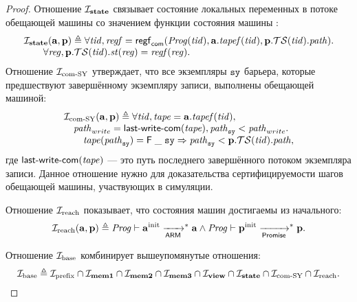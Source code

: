 \begin{proof}
Отношение $\mathcal{I}_{\rm \bf state}$ связывает состояние локальных переменных в потоке обещающей
машины со значением функции состояния машины \ARMt:
\[\begin{array}{l}
\mathcal{I}_{\rm \bf state}(\mathbf{a}, \mathbf{p}) \triangleq
  \forall \mathit{tid}, \mathit{regf} = \mathsf{regf}_\mathsf{com}(\mathit{Prog}(\mathit{tid}), \mathbf{a}.\mathit{tapef}(\mathit{tid}), \mathbf{p}.\mathcal{TS}(\mathit{tid}).\mathit{path}). \\
  \quad \quad \forall \mathit{reg}, \mathbf{p}.\mathcal{TS}(\mathit{tid}).\mathit{st}(\mathit{reg}) = \mathit{regf}(\mathit{reg}).\\
\end{array}\]
Отношение $\mathcal{I}_{\textup{\rm com-SY}}$ утверждает, что все экземпляры $\mathtt{sy}$ барьера, которые
предшествуют завершённому экземпляру записи, выполнены обещающей машиной:
\[\begin{array}{l}
\invComWrite(\aT, \p) \triangleq
  \forall \tId, \tape = \aT.\tapef(\tId), \\
  \quad \cpath_{write} = \lastCommittedWrite(\tape), \cpath_{\SY} < \cpath_{write}. \\
  \qquad  \tape(\cpath_{\SY}) = \tapeFence{\_}{\SY} \Rightarrow \cpath_{\SY} < \p.\TSfprom(\tId).\cpath,
\end{array}\]
где $\textup{\sf last-write-com}(\mathit{tape})$ --- это путь последнего завершённого потоком экземпляра записи.
Данное отношение нужно для доказательства сертифицируемости шагов обещающей машины,
участвующих в симуляции.

Отношение $\mathcal{I}_{\textup{\rm reach}}$ показывает, что состояния машин достигаемы из начального:
\[\mathcal{I}_{\textup{\rm reach}}(\mathbf{a}, \mathbf{p}) \triangleq \mathit{Prog} \vdash \mathbf{a}^{\rm init} \xrightarrow[\mathsf{ARM}]{}^{*} \mathbf{a} \land \mathit{Prog} \vdash \mathbf{p}^{\rm init} \xrightarrow[\mathsf{Promise}]{}^{*} \mathbf{p}.\]

Отношение $\mathcal{I}_{\textup{\rm base}}$ комбинирует вышеупомянутые отношения:
\[\mathcal{I}_{\textup{\rm base}} \triangleq \mathcal{I}_{\textup{\rm prefix}} \cap \mathcal{I}_{\rm \bf mem1} \cap \mathcal{I}_{\rm \bf mem2} \cap \mathcal{I}_{\rm \bf mem3} \cap \mathcal{I}_{\rm \bf view} \cap \mathcal{I}_{\rm \bf state} \cap \mathcal{I}_{\textup{\rm com-SY}} \cap \mathcal{I}_{\textup{\rm reach}}.\]


\end{proof}
